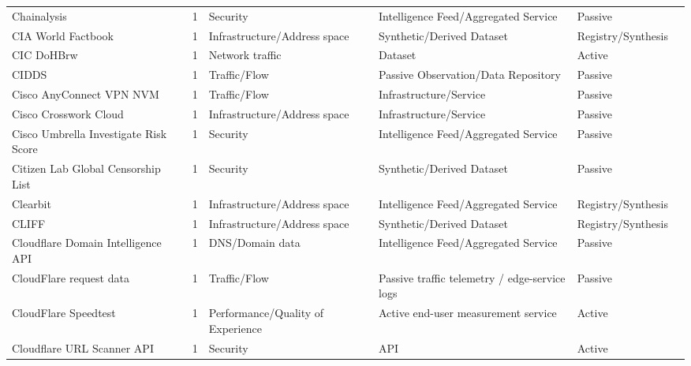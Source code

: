\documentclass[11pt,a4paper]{article}
\begin{document}
\begin{longtable}{@{}p{}p{}p{}p{}p{}p{}p{}@{}}
Chainalysis & \cite{chainalysis} & 1 & Security & Intelligence Feed/Aggregated Service & Passive & \cite{10.1145/3646547.3689005} \\
CIA World Factbook & \cite{cia-world-factbook} & 1 & Infrastructure/Address space & Synthetic/Derived Dataset & Registry/Synthesis & \cite{10.1007/978-3-031-56252-5_11} \\
CIC DoHBrw & \cite{9251211} & 1 & Network traffic & Dataset & Active & \cite{10.1145/3777912.3839833} \\
CIDDS & \cite{cidds-dataset} & 1 & Traffic/Flow & Passive Observation/Data Repository & Passive & \cite{10.1145/3646547.3689011} \\
Cisco AnyConnect VPN NVM & \cite{cisco-nvm} & 1 & Traffic/Flow & Infrastructure/Service & Passive & \cite{10.1007/978-3-030-72582-2_31} \\
Cisco Crosswork Cloud & \cite{cisco-crosswork} & 1 & Infrastructure/Address space & Infrastructure/Service & Passive & \cite{10.1007/978-3-031-85960-1_14} \\
Cisco Umbrella Investigate Risk Score & \cite{cisco-umbrella} & 1 & Security & Intelligence Feed/Aggregated Service & Passive & \cite{10.1007/978-3-030-72582-2_31} \\
Citizen Lab Global Censorship List & \cite{citizen-lab} & 1 & Security & Synthetic/Derived Dataset & Passive & \cite{10.1007/978-3-031-56249-5_5} \\
Clearbit & \cite{clearbit} & 1 & Infrastructure/Address space & Intelligence Feed/Aggregated Service & Registry/Synthesis & \cite{10.1145/3487552.3487853} \\
CLIFF & \cite{cliff} & 1 & Infrastructure/Address space & Synthetic/Derived Dataset & Registry/Synthesis & \cite{10.1145/3618257.3624816} \\
Cloudflare Domain Intelligence API & \cite{cloudflare-domain-intelligence} & 1 & DNS/Domain data & Intelligence Feed/Aggregated Service & Passive & \cite{10.1145/3517745.3561418} \\
CloudFlare request data & \cite{cloudflare-request-data} & 1 & Traffic/Flow & Passive traffic telemetry / edge-service logs & Passive & \cite{10.1145/3517745.3561444} \\
CloudFlare Speedtest & \cite{cloudflare-speedtest} & 1 & Performance/Quality of Experience & Active end-user measurement service & Active & \cite{10.1007/978-3-030-98785-5_4} \\
Cloudflare URL Scanner API & \cite{urlscanner} & 1 & Security & API & Active & \cite{10.1145/3777912.3839788} \\

\end{longtable}
\end{document}
